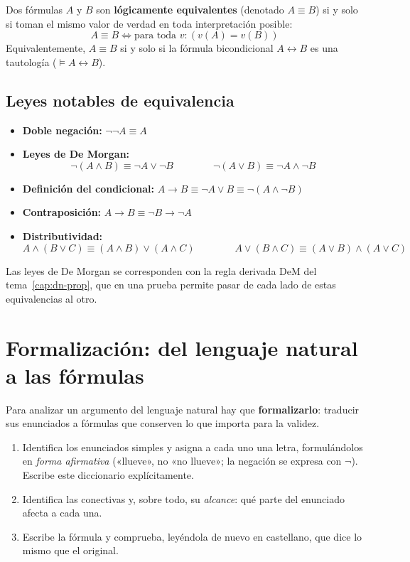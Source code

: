 \begin{definition}
Dos fórmulas $A$ y $B$ son \textbf{lógicamente equivalentes} (denotado $A \equiv B$) si y solo si toman el mismo valor de verdad en toda interpretación posible:
\[
A \equiv B \iff \text{para toda } v: (v(A) = v(B)) 
\]
Equivalentemente, $A \equiv B$ si y solo si la fórmula bicondicional $A \leftrightarrow B$ es una tautología ($\models A \leftrightarrow B$).
\end{definition}

\subsection{Leyes notables de equivalencia}

\begin{itemize}
    \item \textbf{Doble negación:} $\neg\neg A \equiv A$
    \item \textbf{Leyes de De Morgan:} 
    \[
    \neg(A \land B) \equiv \neg A \lor \neg B \qquad\qquad \neg(A \lor B) \equiv \neg A \land \neg B
    \]
    \item \textbf{Definición del condicional:} $A \to B \equiv \neg A \lor B \equiv \neg(A \land \neg B)$
    \item \textbf{Contraposición:} $A \to B \equiv \neg B \to \neg A$
    \item \textbf{Distributividad:} 
    \[
    A \land (B \lor C) \equiv (A \land B) \lor (A \land C) \qquad\qquad A \lor (B \land C) \equiv (A \lor B) \land (A \lor C)
    \]
\end{itemize}

Las leyes de De Morgan se corresponden con la regla derivada DeM del tema~\ref{cap:dn-prop}, que en una prueba permite pasar de cada lado de estas equivalencias al otro.

\section{Formalización: del lenguaje natural a las fórmulas}\label{sec:formalizacion}

Para analizar un argumento del lenguaje natural hay que \textbf{formalizarlo}: traducir sus enunciados a fórmulas que conserven lo que importa para la validez.
\begin{enumerate}
    \item Identifica los enunciados simples y asigna a cada uno una letra, formulándolos en \emph{forma afirmativa} («llueve», no «no llueve»; la negación se expresa con $\neg$). Escribe este diccionario explícitamente.
    \item Identifica las conectivas y, sobre todo, su \emph{alcance}: qué parte del enunciado afecta a cada una.
    \item Escribe la fórmula y comprueba, leyéndola de nuevo en castellano, que dice lo mismo que el original.
\end{enumerate}

